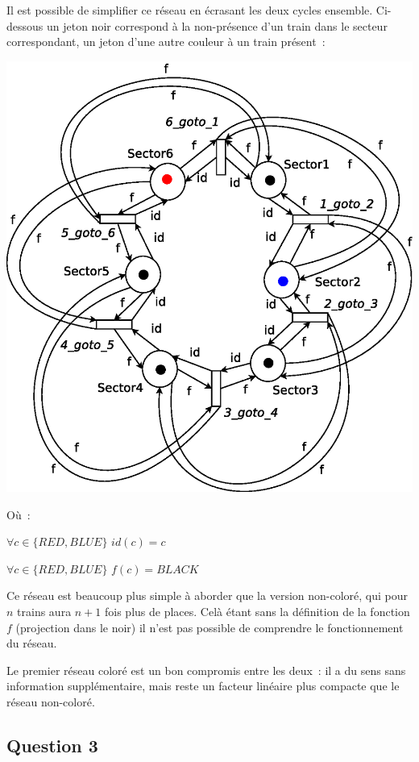 Il est possible de simplifier ce réseau en écrasant les deux cycles ensemble. 
Ci-dessous un jeton noir correspond à la non-présence d'un train dans le secteur 
correspondant, un jeton d'une autre couleur à un train présent~:

\begin{center}
\includegraphics[height = 0.5\paperwidth]{exo8_coloured_2_v2.eps}
\end{center}

Où~:

$\forall c \in \{RED, BLUE\}$ $id(c) = c$

$\forall c \in \{RED, BLUE\}$ $f(c) = BLACK$

Ce réseau est beaucoup plus simple à aborder que la version non-coloré, qui pour
$n$ trains aura $n+1$ fois plus de places. Celà étant sans la définition de la
fonction $f$ (projection dans le noir) il n'est pas possible de comprendre le 
fonctionnement du réseau. 

Le premier réseau coloré est un bon compromis entre les deux~: il a du sens sans
information supplémentaire, mais reste un facteur linéaire plus compacte que le 
réseau non-coloré.


\subsection*{Question 3}
